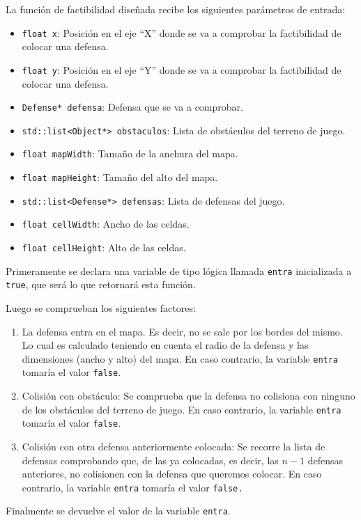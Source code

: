 La función de factibilidad diseñada recibe los siguientes parámetros de entrada:
\begin{itemize}
	\item \texttt{float x}: Posición en el eje ``X'' donde se va a comprobar la factibilidad de colocar una defensa.
	\item \texttt{float y}: Posición en el eje ``Y'' donde se va a comprobar la factibilidad de colocar una defensa.
	\item \texttt{Defense* defensa}: Defensa que se va a comprobar.
	\item \texttt{std::list<Object*> obstaculos}: Lista de obstáculos del terreno de juego.
	\item \texttt{float mapWidth}: Tamaño de la anchura del mapa.
	\item \texttt{float mapHeight}: Tamaño del alto del mapa.
	\item \texttt{std::list<Defense*> defensas}: Lista de defensas del juego.
	\item \texttt{float cellWidth}: Ancho de las celdas.
	\item \texttt{float cellHeight}: Alto de las celdas.
\end{itemize}
Primeramente se declara una variable de tipo lógica llamada \texttt{entra} inicializada a \texttt{true}, que será lo que retornará esta función.

Luego se comprueban los siguientes factores:
\begin{enumerate}
	\item La defensa entra en el mapa. Es decir, no se sale por los bordes del mismo. Lo cual es calculado teniendo en cuenta el radio de la defensa y las dimensiones (ancho y alto) del mapa. En caso contrario, la variable \texttt{entra} tomaría el valor \texttt{false}.
	\item Colisión con obstáculo: Se comprueba que la defensa no colisiona con ninguno de los obstáculos del terreno de juego. En caso contrario, la variable \texttt{entra} tomaría el valor \texttt{false}.
	\item Colisión con otra defensa anteriormente colocada: Se recorre la lista de defensas comprobando que, de las ya colocadas, es decir, las $n-1$ defensas anteriores, no colisionen con la defensa que queremos colocar. En caso contrario, la variable \texttt{entra} tomaría el valor \texttt{false.}
\end{enumerate}
Finalmente se devuelve el valor de la variable \texttt{entra}.